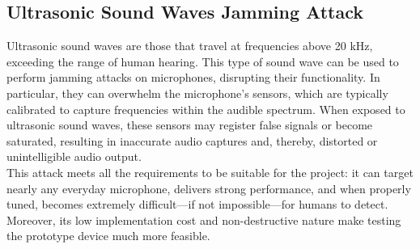 \subsection{Ultrasonic Sound Waves Jamming Attack}
Ultrasonic sound waves are those that travel at frequencies above 20 kHz, exceeding the range of human hearing.
This type of sound wave can be used to perform jamming attacks on microphones, disrupting their functionality.
In particular, they can overwhelm the microphone's sensors, which are typically calibrated to capture frequencies within the audible spectrum.
When exposed to ultrasonic sound waves, these sensors may register false signals or become saturated, resulting in inaccurate audio captures and, thereby, distorted or unintelligible audio output. \\
This attack meets all the requirements to be suitable for the project: it can target nearly any everyday microphone, delivers strong performance, and when properly tuned, becomes extremely difficult—if not impossible—for humans to detect.
Moreover, its low implementation cost and non-destructive nature make testing the prototype device much more feasible.